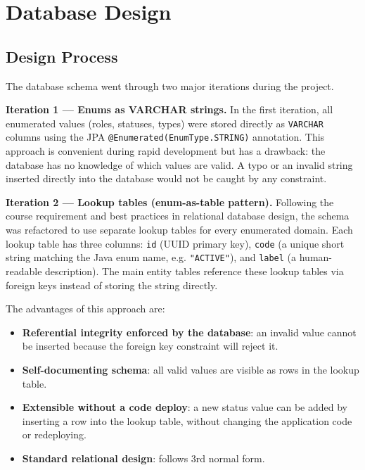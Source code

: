 \documentclass[12pt,a4paper]{report}
\begin{document}
\chapter{Database Design}
\label{ch:database}

\section{Design Process}

The database schema went through two major iterations during the project.

\textbf{Iteration 1 — Enums as VARCHAR strings.}
In the first iteration, all enumerated values (roles, statuses, types) were stored
directly as \texttt{VARCHAR} columns using the JPA \texttt{@Enumerated(EnumType.STRING)}
annotation. This approach is convenient during rapid development but has a drawback:
the database has no knowledge of which values are valid. A typo or an invalid string
inserted directly into the database would not be caught by any constraint.

\textbf{Iteration 2 — Lookup tables (enum-as-table pattern).}
Following the course requirement and best practices in relational database design, the
schema was refactored to use separate lookup tables for every enumerated domain. Each
lookup table has three columns: \texttt{id} (UUID primary key), \texttt{code} (a unique
short string matching the Java enum name, e.g. \texttt{"ACTIVE"}), and \texttt{label}
(a human-readable description). The main entity tables reference these lookup tables
via foreign keys instead of storing the string directly.

The advantages of this approach are:
\begin{itemize}[noitemsep]
  \item \textbf{Referential integrity enforced by the database}: an invalid value cannot
        be inserted because the foreign key constraint will reject it.
  \item \textbf{Self-documenting schema}: all valid values are visible as rows in the
        lookup table.
  \item \textbf{Extensible without a code deploy}: a new status value can be added by
        inserting a row into the lookup table, without changing the application code or
        redeploying.
  \item \textbf{Standard relational design}: follows 3rd normal form.
\end{itemize}
\end{document}
